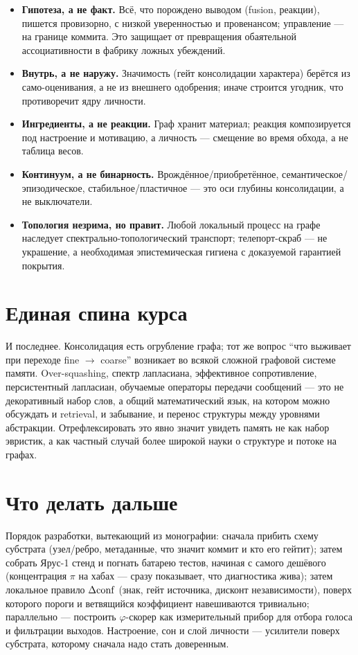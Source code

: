 \begin{itemize}\itemsep2pt
\item \textbf{Гипотеза, а не факт.} Всё, что порождено выводом (fusion,
реакции), пишется провизорно, с низкой уверенностью и провенансом;
управление --- на границе коммита. Это защищает от превращения обаятельной
ассоциативности в фабрику ложных убеждений.
\item \textbf{Внутрь, а не наружу.} Значимость (гейт консолидации характера)
берётся из само-оценивания, а не из внешнего одобрения; иначе строится
угодник, что противоречит ядру личности.
\item \textbf{Ингредиенты, а не реакции.} Граф хранит материал; реакция
композируется под настроение и мотивацию, а личность --- смещение во время
обхода, а не таблица весов.
\item \textbf{Континуум, а не бинарность.}
Врождённое/приобретённое, семантическое/эпизодическое,
стабильное/пластичное --- это оси глубины консолидации, а не выключатели.
\item \textbf{Топология незрима, но правит.} Любой локальный процесс на графе
наследует спектрально-топологический транспорт; телепорт-скраб --- не
украшение, а необходимая эпистемическая гигиена с доказуемой гарантией
покрытия.
\end{itemize}

\section{Единая спина курса}

И последнее. Консолидация есть огрубление графа; тот же вопрос ``что
выживает при переходе fine $\to$ coarse'' возникает во всякой сложной
графовой системе памяти. Over-squashing, спектр лапласиана, эффективное
сопротивление, персистентный лапласиан, обучаемые операторы передачи
сообщений --- это не декоративный набор слов, а общий математический язык,
на котором можно обсуждать и retrieval, и забывание, и перенос структуры
между уровнями абстракции. Отрефлексировать это явно значит увидеть память
не как набор эвристик, а как частный случай более широкой науки о структуре и
потоке на графах.

\section{Что делать дальше}

Порядок разработки, вытекающий из монографии: сначала прибить схему
субстрата (узел/ребро, метаданные, что значит коммит и кто его гейтит);
затем собрать Ярус-1 стенд и погнать батарею тестов, начиная с самого
дешёвого (концентрация $\pi$ на хабах --- сразу показывает, что диагностика
жива); затем локальное правило $\Delta\mathrm{conf}$ (знак, гейт источника, дисконт
независимости), поверх которого пороги и ветвящийся коэффициент
навешиваются тривиально; параллельно --- построить $\varphi$-скорер как
измерительный прибор для отбора голоса и фильтрации выходов. Настроение, сон
и слой личности --- усилители поверх субстрата, которому сначала надо стать
доверенным.
